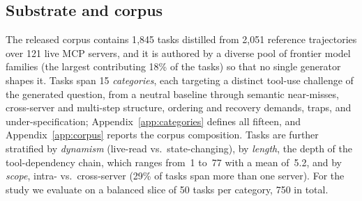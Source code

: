 \subsection{Substrate and corpus}
\label{sec:benchmark:substrate}
The released corpus contains 1{,}845 tasks distilled from 2{,}051 reference
trajectories over 121 live MCP servers, and it is authored by a diverse pool
of frontier model families (the largest contributing 18\% of the tasks) so
that no single generator shapes it. Tasks span 15 \emph{categories}, each
targeting a distinct tool-use challenge of the generated question, from a
neutral baseline through semantic near-misses, cross-server and multi-step
structure, ordering and recovery demands, traps, and under-specification;
Appendix~\ref{app:categories} defines all fifteen, and
Appendix~\ref{app:corpus} reports the corpus composition. Tasks are further stratified by
\emph{dynamism} (live-read vs.\ state-changing), by \emph{length}, the depth
of the tool-dependency chain, which ranges from~1 to~77 with a mean
of~5.2, and by \emph{scope}, intra- vs.\ cross-server (29\% of tasks span
more than one server). For the study we evaluate on a balanced slice of 50
tasks per category, 750 in total.

